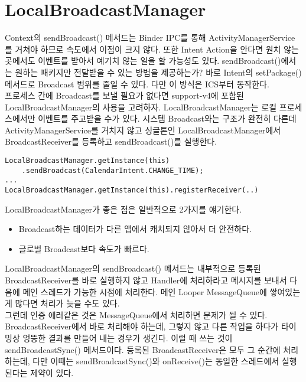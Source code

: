 \section{LocalBroadcastManager}
Context의 sendBroadcast() 메서드는 Binder IPC를 통해 ActivityManagerService를 거쳐야 하므로 속도에서 이점이 크지 않다. 
또한 Intent Action을 안다면 원치 않는 곳에서도 이벤트를 받아서 예기치 않는 일을 할 가능성도 있다.
sendBroadcast()에서는 원하는 패키지만 전달받을 수 있는 방법을 제공하는가?
바로 Intent의 setPackage() 메서드로 Broadcast 범위를 줄일 수 있다. 
다만 이 방식은 ICS부터 동작한다.\\

프로세스 간에 Broadcast를 보낼 필요가 없다면 support-v4에 포함된 LocalBroadcastManager의 사용을 고려하자. 
LocalBroadcastManager는 로컬 프로세스에서만 이벤트를 주고받을 수가 있다.
시스템 Broadcast와는 구조가 완전히 다른데 ActivityManagerService를 거치지 않고 싱글톤인 LocalBroadcastManager에서 BroadcastReceiver를 등록하고 sendBroadcast()를 실행한다.

\begin{lstlisting}[frame=single] 
LocalBroadcastManager.getInstance(this)
	.sendBroadcast(CalendarIntent.CHANGE_TIME);
...
LocalBroadcastManager.getInstance(this).registerReceiver(..)
\end{lstlisting}

LocalBroadcastManager가 좋은 점은 일반적으로 2가지를 얘기한다.
\begin{itemize}
\item Broadcast하는 데이터가 다른 앱에서 캐치되지 않아서 더 안전하다.
\item 글로벌 Broadcast보다 속도가 빠르다.
\end{itemize}

LocalBroadcastManager의 sendBroadcast() 메서드는 내부적으로 등록된 BroadcastReceiver를 바로 실행하지 않고 Handler에 처리하라고 메시지를 보내서 다음에 메인 스레드가 가능한 시점에 처리한다. 메인 Looper MessageQueue에 쌓여있는 게 많다면 처리가 늦을 수도 있다.\\

그런데 인증 에러같은 것은 MessageQueue에서 처리하면 문제가 될 수 있다.
BroadcastReceiver에서 바로 처리해야 하는데, 그렇지 않고 다른 작업을 하다가 타이밍상 엉뚱한 결과를 만들어 내는 경우가 생긴다. 
이럴 때 쓰는 것이 sendBroadcastSync() 메서드이다. 
등록된 BroadcastReceiver은 모두 그 순간에 처리하는데, 다만 이때는 sendBroadcastSync()와 onReceive()는 동일한 스레드에서 실행된다는 제약이 있다.\\

